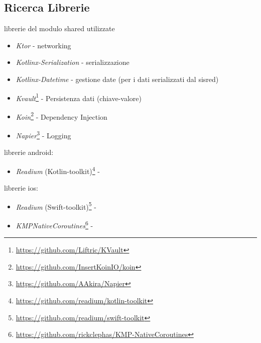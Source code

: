 \subsection{Ricerca Librerie}
librerie del modulo shared utilizzate
\begin{itemize}
    \item \textit{Ktor} - networking
    \item \textit{Kotlinx-Serialization} - serializzazione
    \item \textit{Kotlinx-Datetime} - gestione date (per i dati serializzati dal sisred)
    \item \textit{Kvault}\footnote{\url{https://github.com/Liftric/KVault}} - Persistenza dati (chiave-valore)  
    \item \textit{Koin}\footnote{\url{https://github.com/InsertKoinIO/koin}} - Dependency Injection
    \item \textit{Napier}\footnote{\url{https://github.com/AAkira/Napier}} - Logging
\end{itemize}

librerie android:
\begin{itemize}
    \item \textit{Readium} (Kotlin-toolkit)\footnote{\url{https://github.com/readium/kotlin-toolkit}} -
\end{itemize}

librerie ios:
\begin{itemize}
    \item \textit{Readium} (Swift-toolkit)\footnote{\url{https://github.com/readium/swift-toolkit}} -
    \item \textit{KMPNativeCoroutines}\footnote{\url{https://github.com/rickclephas/KMP-NativeCoroutines}} -
\end{itemize}

